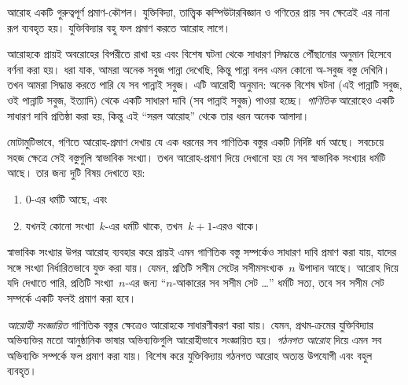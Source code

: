 \documentclass[../../../include/open-logic-section]{subfiles}
\begin{document}


আরোহ একটি গুরুত্বপূর্ণ প্রমাণ-কৌশল। যুক্তিবিদ্যা, তাত্ত্বিক
কম্পিউটারবিজ্ঞান ও গণিতের প্রায় সব ক্ষেত্রেই এর নানা রূপ
ব্যবহৃত হয়। যুক্তিবিদ্যার বহু ফল প্রমাণ করতে আরোহ লাগে।

আরোহকে প্রায়ই অবরোহের বিপরীতে রাখা হয় এবং বিশেষ ঘটনা
থেকে সাধারণ সিদ্ধান্তে পৌঁছানোর অনুমান হিসেবে বর্ণনা করা হয়।
ধরা যাক, আমরা অনেক সবুজ পান্না দেখেছি, কিন্তু পান্না বলব
এমন কোনো অ-সবুজ বস্তু দেখিনি। তখন আমরা সিদ্ধান্ত করতে পারি
যে সব পান্নাই সবুজ। এটি আরোহী অনুমান: অনেক বিশেষ ঘটনা
(এই পান্নাটি সবুজ, ওই পান্নাটি সবুজ, ইত্যাদি) থেকে একটি
সাধারণ দাবি (সব পান্নাই সবুজ) পাওয়া হচ্ছে। \emph{গাণিতিক}
আরোহেও একটি সাধারণ দাবি প্রতিষ্ঠা করা হয়, কিন্তু এই
``সরল আরোহ'' থেকে তার ধরন অনেক আলাদা।

মোটামুটিভাবে, গণিতে আরোহ-প্রমাণ দেখায় যে এক ধরনের সব
গাণিতিক বস্তুর একটি নির্দিষ্ট ধর্ম আছে। সবচেয়ে সহজ ক্ষেত্রে
সেই বস্তুগুলি স্বাভাবিক সংখ্যা। তখন আরোহ-প্রমাণ দিয়ে
দেখানো হয় যে সব স্বাভাবিক সংখ্যার ধর্মটি আছে। তার জন্য
দুটি বিষয় দেখাতে হয়:
\begin{enumerate}
    \item $0$-এর ধর্মটি আছে, এবং
    \item যখনই কোনো সংখ্যা~$k$-এর ধর্মটি থাকে, তখন~$k+1$-এরও থাকে।
\end{enumerate}
স্বাভাবিক সংখ্যার উপর আরোহ ব্যবহার করে প্রায়ই এমন
গাণিতিক বস্তু সম্পর্কেও সাধারণ দাবি প্রমাণ করা যায়,
যাদের সঙ্গে সংখ্যা নির্ধারিতভাবে যুক্ত করা যায়। যেমন,
প্রতিটি সসীম সেটের সসীমসংখ্যক~$n$ উপাদান আছে। আরোহ দিয়ে
যদি দেখাতে পারি, প্রতিটি সংখ্যা~$n$-এর জন্য ``$n$-আকারের
সব সসীম সেট \dots'' ধর্মটি সত্য, তবে সব সসীম সেট সম্পর্কে
একটি ফলই প্রমাণ করা হবে।

\emph{আরোহী সংজ্ঞায়িত} গাণিতিক বস্তুর ক্ষেত্রেও আরোহকে
সাধারণীকরণ করা যায়। যেমন, প্রথম-ক্রমের যুক্তিবিদ্যার
অভিব্যক্তির মতো আনুষ্ঠানিক ভাষার অভিব্যক্তিগুলি আরোহীভাবে
সংজ্ঞায়িত হয়। \emph{গঠনগত আরোহ} দিয়ে এমন সব অভিব্যক্তি
সম্পর্কে ফল প্রমাণ করা যায়। বিশেষ করে যুক্তিবিদ্যায়
গঠনগত আরোহ অত্যন্ত উপযোগী এবং বহুল ব্যবহৃত।
\end{document}

